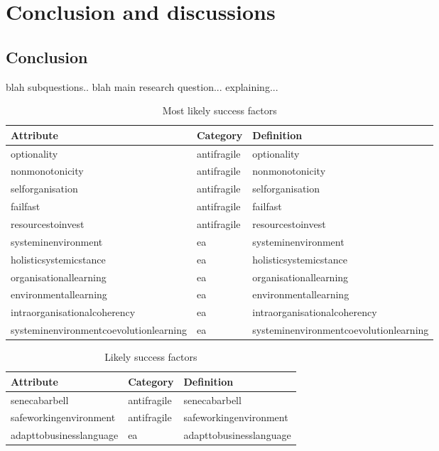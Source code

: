 \chapter{Conclusion and discussions}
\label{ch:conclusionanddiscussions}



\section{Conclusion}
\label{sec:conclusion}
blah subquestions.. blah main research question... explaining...


\begin{longtable}{@{}p{}p{}p{}@{}}
	\textbf{Attribute} & \textbf{Category} & \textbf{Definition} \\%
	\midrule%
	\endhead%
	\hline
	\endfoot%
	\caption[Most likely success factors]{Most likely success factors}
	\label{tab:identifiedsuccessfactors}
	\endlastfoot%
	\Gls{optionality} & \Gls{antifragile} & \Glsdesc*{optionality} \\%
	\Gls{nonmonotonicity} & \Gls{antifragile} & \Glsdesc*{nonmonotonicity} \\%
	\Gls{selforganisation} & \Gls{antifragile} & \Glsdesc*{selforganisation} \\%
	\Gls{failfast} & \Gls{antifragile} & \Glsdesc*{failfast} \\%
	\Gls{resourcestoinvest} & \Gls{antifragile} & \Glsdesc*{resourcestoinvest} \\%
	\Gls{systeminenvironment} & \acrlong{ea} & \Glsdesc*{systeminenvironment} \\%
	\Gls{holisticsystemicstance} & \acrlong{ea} & \Glsdesc*{holisticsystemicstance} \\%
	\Gls{organisationallearning} & \acrlong{ea} & \Glsdesc*{organisationallearning} \\%
	\Gls{environmentallearning} & \acrlong{ea} & \Glsdesc*{environmentallearning} \\%
	\Gls{intraorganisationalcoherency} & \acrlong{ea} & \Glsdesc*{intraorganisationalcoherency} \\%
	\Gls{systeminenvironmentcoevolutionlearning} & \acrlong{ea} & \Glsdesc*{systeminenvironmentcoevolutionlearning} \\%
		\bottomrule%
\end{longtable}%


\begin{longtable}{@{}p{}p{}p{}@{}}
	\textbf{Attribute} & \textbf{Category} & \textbf{Definition} \\%
	\midrule%
	\endhead%
	\hline
	\endfoot%
	\caption[Likely success factors]{Likely success factors}
	\label{tab:identifiedpossiblefactors}
	\endlastfoot%
	\Gls{senecabarbell} & \Gls{antifragile} & \Glsdesc*{senecabarbell} \\%
	\Gls{safeworkingenvironment} & \Gls{antifragile} & \Glsdesc*{safeworkingenvironment} \\%
	\Gls{adapttobusinesslanguage} & \acrlong{ea} & \Glsdesc*{adapttobusinesslanguage} \\%
	\bottomrule%
\end{longtable}%

